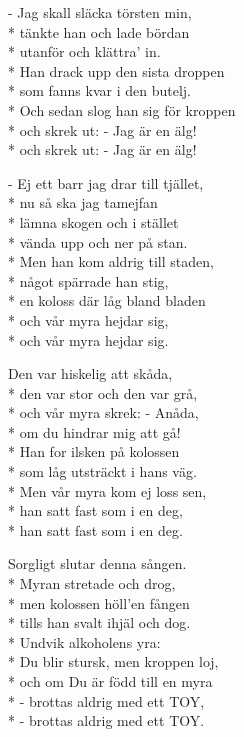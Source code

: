 \begin{SongText}
\begin{SongVerse}
- Jag skall släcka törsten min,\\*%
tänkte han och lade bördan\\*%
utanför och klättra' in.\\*%
Han drack upp den sista droppen\\*%
som fanns kvar i den butelj.\\*%
Och sedan slog han sig för kroppen\\*%
och skrek ut: - Jag är en älg!\\*%
och skrek ut: - Jag är en älg!
\end{SongVerse}
\begin{SongVerse}
- Ej ett barr jag drar till tjället,\\*%
nu så ska jag tamejfan\\*%
lämna skogen och i stället\\*%
vända upp och ner på stan.\\*%
Men han kom aldrig till staden,\\*%
något spärrade han stig,\\*%
en koloss där låg bland bladen\\*%
och vår myra hejdar sig,\\*%
och vår myra hejdar sig.
\end{SongVerse}
\begin{SongVerse}
Den var hiskelig att skåda,\\*%
den var stor och den var grå,\\*%
och vår myra skrek: - Anåda,\\*%
om du hindrar mig att gå!\\*%
Han for ilsken på kolossen\\*%
som låg utsträckt i hans väg.\\*%
Men vår myra kom ej loss sen,\\*%
han satt fast som i en deg,\\*%
han satt fast som i en deg. 
\end{SongVerse}
\begin{SongVerse}
Sorgligt slutar denna sången.\\*%
Myran stretade och drog,\\*%
men kolossen höll'en fången\\*%
tills han svalt ihjäl och dog.\\*%
Undvik alkoholens yra:\\*%
Du blir stursk, men kroppen loj,\\*%
och om Du är född till en myra\\*%
- brottas aldrig med ett TOY,\\*%
- brottas aldrig med ett TOY. 
\end{SongVerse}
\end{SongText}
